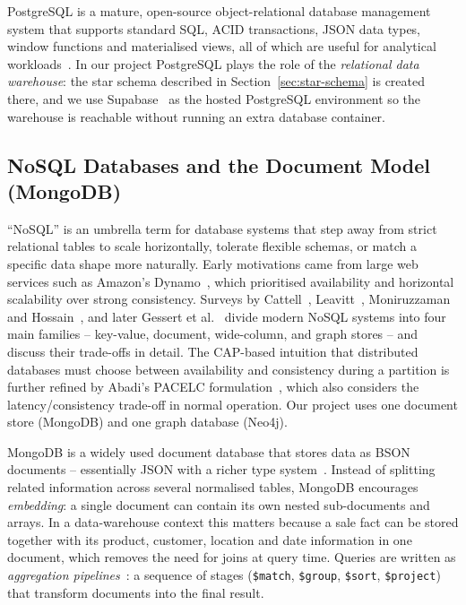 \documentclass[11pt,a4paper]{article}
\begin{document}
PostgreSQL is a mature, open-source object-relational database management
system that supports standard SQL, ACID transactions, JSON data types,
window functions and materialised views, all of which are useful for
analytical workloads~\cite{postgresql_docs}. In our project PostgreSQL
plays the role of the \emph{relational data warehouse}: the star schema
described in Section~\ref{sec:star-schema} is created there, and we use
Supabase~\cite{supabase_docs} as the hosted PostgreSQL environment so the
warehouse is reachable without running an extra database container.

\subsection{NoSQL Databases and the Document Model (MongoDB)}

``NoSQL'' is an umbrella term for database systems that step away from
strict relational tables to scale horizontally, tolerate flexible schemas,
or match a specific data shape more naturally. Early motivations came from
large web services such as Amazon's Dynamo~\cite{decandia2007dynamo},
which prioritised availability and horizontal scalability over strong
consistency. Surveys by Cattell~\cite{cattell2011nosql},
Leavitt~\cite{leavitt2010nosql}, Moniruzzaman and
Hossain~\cite{moniruzzaman2013nosql}, and later Gessert et
al.~\cite{gessert2017nosql} divide modern NoSQL systems into four main
families -- key-value, document, wide-column, and graph stores -- and
discuss their trade-offs in detail. The CAP-based intuition that
distributed databases must choose between availability and consistency
during a partition is further refined by Abadi's PACELC
formulation~\cite{abadi2012pacelc}, which also considers the
latency/consistency trade-off in normal operation. Our project uses one
document store (MongoDB) and one graph database (Neo4j).

MongoDB is a widely used document database that stores data as BSON
documents -- essentially JSON with a richer type system~\cite{mongodb_docs}.
Instead of splitting related information across several normalised tables,
MongoDB encourages \emph{embedding}: a single document can contain its own
nested sub-documents and arrays. In a data-warehouse context this matters
because a sale fact can be stored together with its product, customer,
location and date information in one document, which removes the need for
joins at query time. Queries are written as \emph{aggregation
pipelines}~\cite{mongodb_aggregation}: a sequence of stages
(\texttt{\$match}, \texttt{\$group}, \texttt{\$sort}, \texttt{\$project})
that transform documents into the final result.
\end{document}
